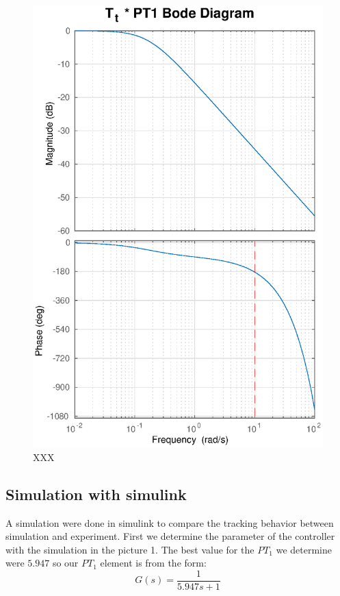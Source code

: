 \begin{figure}
    \centering
    \includegraphics[width=\linewidth]{images/Tt_PT1_bode}
    \caption{XXX}
\end{figure}

\subsection{Simulation with simulink}
A simulation were done in simulink to compare the tracking behavior between simulation and experiment.
First we determine the parameter of the controller with the simulation in the picture 1.
The best value for the $PT_{1}$ we determine were $5.947$
so our $PT_{1}$ element is from the form:
\begin{equation}
G(s) = \frac{1}{5.947s+1}
\end{equation}